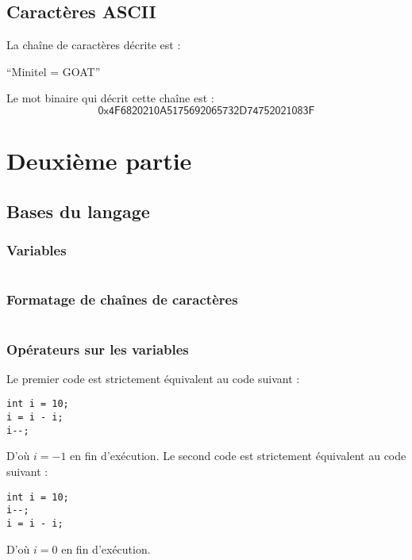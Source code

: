 \documentclass[../main.tex]{subfiles}
\begin{document}
\subsection{Caractères ASCII}
 La chaîne de caractères décrite est : 
\begin{center}
``Minitel = GOAT''
\end{center}
 Le mot binaire qui décrit cette chaîne est :
$$\textsf{0x4F6820210A5175692065732D74752021083F}$$
\section{Deuxième partie}
\subsection{Bases du langage}
\subsubsection{Variables}
\inputminted{c}{solutions/inter_var_side_effect.c}
\subsubsection{Formatage de chaînes de caractères}
\inputminted{c}{solutions/taille_types.c}
\subsubsection{Opérateurs sur les variables}
 
Le premier code est strictement équivalent au code suivant :
\begin{verbatim}
int i = 10;
i = i - i;
i--;
\end{verbatim}
D'où $i = -1$ en fin d'exécution. 
Le second code est strictement équivalent au code suivant :
\begin{verbatim}
int i = 10;
i--;
i = i - i;
\end{verbatim}
D'où $i = 0$ en fin d'exécution.
 
\end{document}
